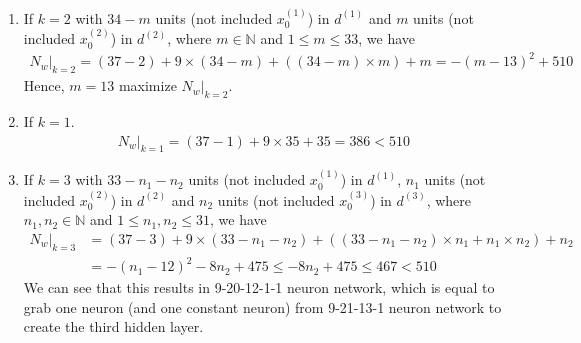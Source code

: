 \documentclass[12pt]{article}
\newcommand{\ParTh}[1]{\left(#1\right)}
\begin{document}
\begin{enumerate}
	\item If $k=2$ with $34-m$ units (not included $x^{\ParTh{1}}_0$) in $d^{\ParTh{1}}$ and $m$ units (not included $x^{\ParTh{2}}_0$) in $d^{\ParTh{2}}$, where $m\in\mathbb{N}$ and $1\leq m\leq33$, we have
	\begin{align}
	\left.N_w\right|_{k=2}=\ParTh{37-2}+9\times\ParTh{34-m}+\ParTh{\ParTh{34-m}\times m}+m=-\ParTh{m-13}^2+510
	\end{align}
	Hence, $m=13$ maximize $\left.N_w\right|_{k=2}$.
	\item If $k=1$.
	\begin{align}
	\left.N_w\right|_{k=1}=\ParTh{37-1}+9\times35+35=386<510
	\end{align}
	\item If $k=3$ with $33-n_1-n_2$ units (not included $x^{\ParTh{1}}_0$) in $d^{\ParTh{1}}$, $n_1$ units (not included $x^{\ParTh{2}}_0$) in $d^{\ParTh{2}}$ and $n_2$ units (not included $x^{\ParTh{3}}_0$) in $d^{\ParTh{3}}$, where $n_1,n_2\in\mathbb{N}$ and $1\leq n_1,n_2\leq31$, we have
	\begin{align}
	\left.N_w\right|_{k=3}&=\ParTh{37-3}+9\times\ParTh{33-n_1-n_2}+\ParTh{\ParTh{33-n_1-n_2}\times n_1+n_1\times n_2}+n_2\\
	&=-\ParTh{n_1-12}^2-8n_2+475\leq-8n_2+475\leq467<510
	\end{align}
	We can see that this results in 9-20-12-1-1 neuron network, which is equal to grab one neuron (and one constant neuron) from 9-21-13-1 neuron network to create the third hidden layer.

\end{enumerate}
\end{document}
